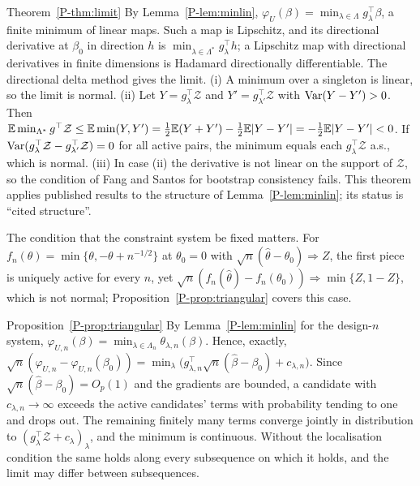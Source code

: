 \begin{proofof}{Theorem~\ref{P-thm:limit}}
By Lemma~\ref{P-lem:minlin}, $\varphi_U(\beta)=\min_{\lambda\in\Lambda}g_\lambda^\top\beta$,
a finite minimum of linear maps. Such a map is Lipschitz, and its directional derivative
at $\beta_0$ in direction $h$ is $\min_{\lambda\in\Lambda^*}g_\lambda^\top h$; a Lipschitz
map with directional derivatives in finite dimensions is Hadamard directionally
differentiable. The directional delta method gives the limit. (i) A minimum over a
singleton is linear, so the limit is normal. (ii) Let $Y=g_\lambda^\top\mathcal Z$ and
$Y'=g_{\lambda'}^\top\mathcal Z$ with $\operatorname{Var}(Y-Y')>0$. Then
$\mathbb E\min_{\Lambda^*}g^\top\mathcal Z\le\mathbb E\min(Y,Y')=\tfrac12\mathbb E(Y+Y')-\tfrac12\mathbb E|Y-Y'|=-\tfrac12\mathbb E|Y-Y'|<0$.
If $\operatorname{Var}(g_\lambda^\top\mathcal Z-g_{\lambda'}^\top\mathcal Z)=0$ for all active pairs, the
minimum equals each $g_\lambda^\top\mathcal Z$ a.s., which is normal. (iii) In case (ii)
the derivative is not linear on the support of $\mathcal Z$, so the condition of
Fang and Santos for bootstrap consistency fails. This theorem applies published results
to the structure of Lemma~\ref{P-lem:minlin}; its status is ``cited structure''.

The condition that the constraint system be fixed matters. For
$f_n(\theta)=\min\{\theta,-\theta+n^{-1/2}\}$ at $\theta_0=0$ with
$\sqrt n(\hat\theta-\theta_0)\Rightarrow Z$, the first piece is uniquely active for every
$n$, yet $\sqrt n(f_n(\hat\theta)-f_n(\theta_0))\Rightarrow\min\{Z,1-Z\}$, which is not
normal; Proposition~\ref{P-prop:triangular} covers this case.
\end{proofof}

\begin{proofof}{Proposition~\ref{P-prop:triangular}}
By Lemma~\ref{P-lem:minlin} for the design-$n$ system,
$\varphi_{U,n}(\beta)=\min_{\lambda\in\Lambda_n}\theta_{\lambda,n}(\beta)$. Hence, exactly,
$\sqrt n(\hat\varphi_{U,n}-\varphi_{U,n}(\beta_0))=\min_\lambda\big(g_{\lambda,n}^\top\sqrt
n(\hat\beta-\beta_0)+c_{\lambda,n}\big)$. Since $\sqrt n(\hat\beta-\beta_0)=O_p(1)$ and the
gradients are bounded, a candidate with $c_{\lambda,n}\to\infty$ exceeds the active
candidates' terms with probability tending to one and drops out. The remaining
finitely many terms converge jointly in distribution to
$(g_\lambda^\top\mathcal Z+c_\lambda)_\lambda$, and the minimum is continuous. Without the
localisation condition the same holds along every subsequence on which it holds, and
the limit may differ between subsequences.
\end{proofof}


